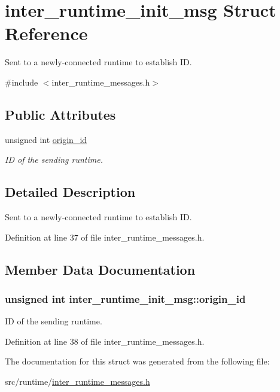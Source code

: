 \hypertarget{structinter__runtime__init__msg}{\section{inter\-\_\-runtime\-\_\-init\-\_\-msg Struct Reference}
\label{structinter__runtime__init__msg}
}


Sent to a newly-\/connected runtime to establish I\-D.  




{\ttfamily \#include $<$inter\-\_\-runtime\-\_\-messages.\-h$>$}

\subsection*{Public Attributes}
\begin{DoxyCompactItemize}
\item 
unsigned int \hyperlink{structinter__runtime__init__msg_a8c8d29e7a9b0fc577109278b7ba1a127}{origin\-\_\-id}
\begin{DoxyCompactList}\small\item\em I\-D of the sending runtime. \end{DoxyCompactList}\end{DoxyCompactItemize}


\subsection{Detailed Description}
Sent to a newly-\/connected runtime to establish I\-D. 

Definition at line 37 of file inter\-\_\-runtime\-\_\-messages.\-h.



\subsection{Member Data Documentation}
\hypertarget{structinter__runtime__init__msg_a8c8d29e7a9b0fc577109278b7ba1a127}{
\subsubsection[{origin\-\_\-id}]{\setlength{\rightskip}{0pt plus 5cm}unsigned int inter\-\_\-runtime\-\_\-init\-\_\-msg\-::origin\-\_\-id}}\label{structinter__runtime__init__msg_a8c8d29e7a9b0fc577109278b7ba1a127}


I\-D of the sending runtime. 



Definition at line 38 of file inter\-\_\-runtime\-\_\-messages.\-h.



The documentation for this struct was generated from the following file\-:\begin{DoxyCompactItemize}
\item 
src/runtime/\hyperlink{inter__runtime__messages_8h}{inter\-\_\-runtime\-\_\-messages.\-h}\end{DoxyCompactItemize}
